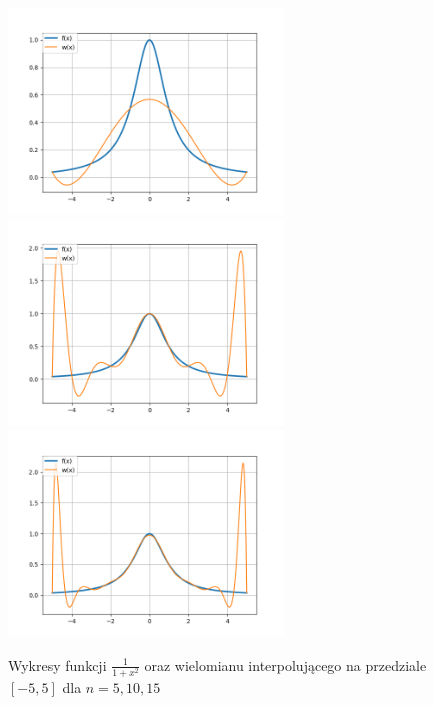\documentclass{article}
\begin{document}
\begin{figure}[H]
    \centering
    \includegraphics[width=0.65\textwidth]{plots/6b_5.png}
    \includegraphics[width=0.65\textwidth]{plots/6b_10.png}
    \includegraphics[width=0.65\textwidth]{plots/6b_15.png}
    \caption{Wykresy funkcji $\frac{1}{1+x^2}$ oraz wielomianu interpolującego na przedziale 
    $[-5,5]$ dla $n=5,10,15$}
\end{figure}

    
\end{document}
